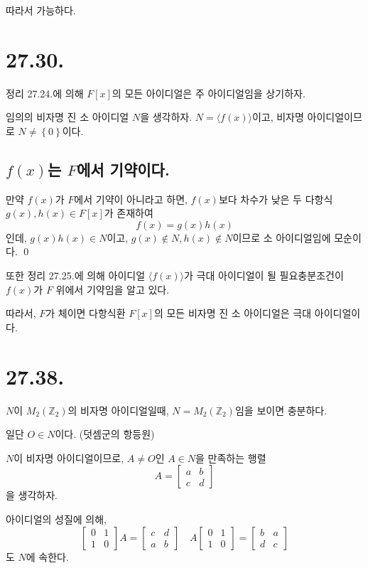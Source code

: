 \documentclass{article}
\begin{document}
따라서 가능하다.

\section{27.30.}
정리 27.24.에 의해 $F[x]$의 모든 아이디얼은 주 아이디얼임을 상기하자.

임의의 비자명 진 소 아이디얼 $N$을 생각하자. $N = \langle f(x) \rangle$이고, 비자명 아이디얼이므로 $N \neq \left\{0\right\}$이다.

\subsection{$f(x)$는 $F$에서 기약이다.}
만약 $f(x)$가 $F$에서 기약이 아니라고 하면, $f(x)$보다 차수가 낮은 두 다항식 $g(x), h(x) \in F[x]$가 존재하여
$$f(x) = g(x) h(x)$$인데, $g(x) h(x) \in N$이고, $g(x) \notin N, h(x) \notin N$이므로 소 아이디얼임에 모순이다. \qed

또한 정리 27.25.에 의해 아이디얼 $\langle f(x) \rangle$가 극대 아이디얼이 될 필요충분조건이 $f(x)$가 $F$ 위에서 기약임을 알고 있다.

따라서, $F$가 체이면 다항식환 $F[x]$의 모든 비자명 진 소 아이디얼은 극대 아이디얼이다.

\section{27.38.}
$N$이 $M_2 ( \mathbb{Z}_2)$의 비자명 아이디얼일때, $N = M_2 ( \mathbb{Z}_2)$임을 보이면 충분하다.

일단 $O \in N$이다. (덧셈군의 항등원)

$N$이 비자명 아이디얼이므로, $A \neq O$인 $A \in N$을 만족하는 행렬
$$ A = \begin{bmatrix}
a&b  \\ 
c&d 
\end{bmatrix}$$을 생각하자.

아이디얼의 성질에 의해, 
$$ \begin{bmatrix}
0&1  \\ 
1&0 
\end{bmatrix}
A = \begin{bmatrix}
c&d  \\ 
a&b 
\end{bmatrix}
\quad
A\begin{bmatrix}
	0&1  \\ 
	1&0 
\end{bmatrix}
= \begin{bmatrix}
	b&a  \\ 
	d&c 
\end{bmatrix}
$$도 $N$에 속한다.
\end{document}

